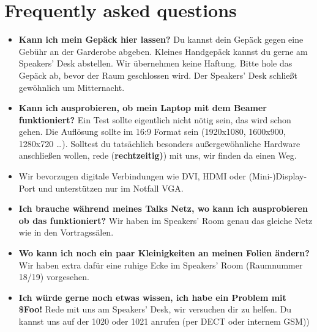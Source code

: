 \documentclass[paper=a4]{scrartcl}
\begin{document}
\section*{Frequently asked questions}
\begin{itemize}
	\item \textbf{Kann ich mein Gepäck hier lassen?} Du kannst dein Gepäck gegen eine Gebühr an der Garderobe abgeben. Kleines Handgepäck kannst du gerne am Speakers' Desk abstellen. Wir übernehmen keine Haftung. Bitte hole das Gepäck ab, bevor der Raum geschlossen wird. Der Speakers' Desk schließt gewöhnlich um Mitternacht.
	\item \textbf{Kann ich ausprobieren, ob mein Laptop mit dem Beamer funktioniert?} Ein Test sollte eigentlich nicht nötig sein, das wird schon gehen. Die Auflösung sollte im 16:9 Format sein (1920x1080, 1600x900, 1280x720 \ldots). Solltest du tatsächlich besonders außergewöhnliche Hardware anschließen wollen, rede (\textbf{rechtzeitig)}) mit uns, wir finden da einen Weg.
	\item Wir bevorzugen digitale Verbindungen wie DVI, HDMI oder (Mini-)Display-Port und unterstützen nur im Notfall VGA.
	\item \textbf{Ich brauche während meines Talks Netz, wo kann ich ausprobieren ob das funktioniert?} Wir haben im Speakers' Room genau das gleiche Netz wie in den Vortragssälen.
	\item \textbf{Wo kann ich noch ein paar Kleinigkeiten an meinen Folien ändern?}
	 Wir haben extra dafür eine ruhige Ecke im Speakers' Room (Raumnummer 18/19) vorgesehen.
	\item \textbf{Ich würde gerne noch etwas wissen, ich habe ein Problem mit \$Foo!} Rede mit uns am Speakers' Desk, wir versuchen dir zu helfen. Du kannst uns auf der 1020 oder 1021 anrufen (per DECT oder internem GSM))
\end{itemize}
\end{document}
